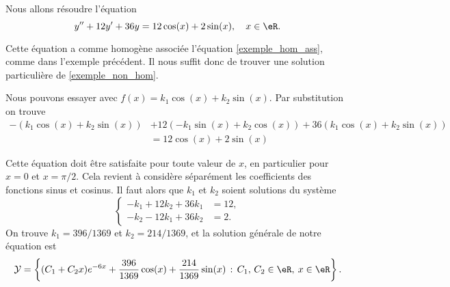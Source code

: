\begin{example}
	Nous allons résoudre l'équation
	\begin{equation}
		y'' + 12y' + 36 y = 12\cos(x) + 2\sin(x), \quad x\in\eR.
	\end{equation}

	Cette équation a comme homogène associée l'équation \eqref{exemple_hom_ass}, comme dans l'exemple précédent. Il nous suffit donc de trouver une solution particulière de \eqref{exemple_non_hom}.

	Nous pouvons essayer avec $f(x)= k_1\cos(x) + k_2\sin(x)$. Par substitution on trouve
	\begin{equation*}
		\begin{aligned}
			-\left(k_1\cos(x) + k_2\sin(x)\right) & +12 \left(-k_1\sin(x) + k_2\cos(x)\right) + 36\left(k_1\cos(x) + k_2\sin(x)\right) \\
			                                      & = 12\cos(x) + 2\sin(x)
		\end{aligned}
	\end{equation*}

	Cette équation doit \^etre satisfaite pour toute valeur de $x$, en particulier pour $x= 0$ et $x = \pi/2$. Cela revient à considère séparément les coefficients des fonctions sinus et cosinus. Il faut alors que $k_1$ et $k_2$ soient solutions du système
	\begin{equation*}
		\begin{cases}
			-k_1 + 12 k_2 + 36 k_1 & = 12, \\
			-k_2 - 12 k_1 + 36 k_2 & = 2.
		\end{cases}
	\end{equation*}
	On trouve $k_1= 396/1369$ et $k_2 = 214/1369$, et la solution générale de notre équation est
	\begin{equation*}
		\mathcal{Y}  = \left\{(C_1  +C_2x) e^{-6 x} +\frac{396}{1369}\cos(x) + \frac{214}{1369}\sin(x) \,:\, C_1,\, C_2 \in \eR, \: x\in \eR\right\}.
	\end{equation*}
\end{example}

